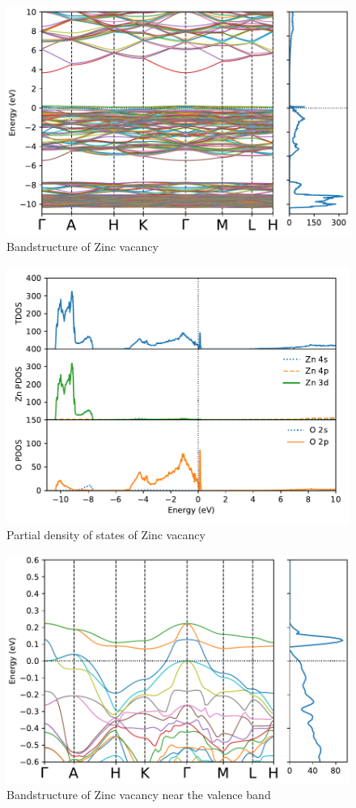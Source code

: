 \begin{figure}[tbh!]
	\centering
	\includegraphics[width=0.7\linewidth]{"images/rnd/band-dos_Zn_vac"}
	\caption[Bandstructure of Zinc vacancy]{Bandstructure of Zinc vacancy}
\end{figure}

\begin{figure}[tbh!]
	\centering
	\includegraphics[width=0.7\linewidth]{"images/rnd/dos-pdos_Zn_vac"}
	\caption[Partial density of states of Zinc vacancy]{Partial density of states of Zinc vacancy}
\end{figure}

\begin{figure}[tbh!]
	\centering
	\includegraphics[width=0.7\linewidth]{"images/rnd/band-dos-close_Zn_vac"}
	\caption[Bandstructure of Zinc vacancy near the valence band]{Bandstructure of Zinc vacancy near the valence band}
\end{figure}

